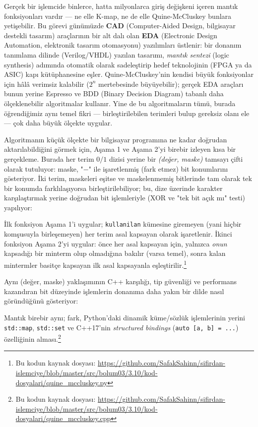 \begin{detaybilgi}
Gerçek bir işlemcide binlerce, hatta milyonlarca giriş değişkeni içeren mantık
fonksiyonları vardır --- ne elle K-map, ne de elle Quine-McCluskey bunlara
yetişebilir. Bu görevi günümüzde \textbf{CAD} (Computer-Aided Design, bilgisayar
destekli tasarım) araçlarının bir alt dalı olan \textbf{EDA} (Electronic Design
Automation, elektronik tasarım otomasyonu) yazılımları üstlenir: bir donanım tanımlama
dilinde (Verilog/VHDL) yazılan tasarımı, \emph{mantık sentezi} (logic synthesis) adımında
otomatik olarak sadeleştirip hedef teknolojinin (FPGA ya da ASIC) kapı kütüphanesine
eşler. Quine-McCluskey'nin kendisi büyük fonksiyonlar için hâlâ verimsiz kalabilir
($2^n$ mertebesinde büyüyebilir); gerçek EDA araçları bunun yerine Espresso ve
BDD (Binary Decision Diagram) tabanlı daha ölçeklenebilir algoritmalar kullanır. Yine
de bu algoritmaların tümü, burada öğrendiğimiz aynı temel fikri --- birleştirilebilen
terimleri bulup gereksiz olanı ele --- çok daha büyük ölçekte uygular.

Algoritmanın küçük ölçekte bir bilgisayar programına ne kadar doğrudan aktarılabildiğini
görmek için, Aşama 1 ve Aşama 2'yi birebir izleyen kısa bir gerçekleme. Burada her terim
$0/1$ dizisi yerine bir \emph{(değer, maske)} tamsayı çifti olarak tutuluyor: maske,
"$-$" ile işaretlenmiş (fark etmez) bit konumlarını gösteriyor. İki terim, maskeleri
eşitse ve maskelenmemiş bitlerinde tam olarak tek bir konumda farklılaşıyorsa
birleştirilebiliyor; bu, dize üzerinde karakter karşılaştırmak yerine doğrudan bit
işlemleriyle (XOR ve "tek bit açık mı" testi) yapılıyor:


İlk fonksiyon Aşama 1'i uygular; \texttt{kullanilan} kümesine giremeyen (yani hiçbir
komşusuyla birleşemeyen) her terim asal kapsayan olarak işaretlenir. İkinci fonksiyon
Aşama 2'yi uygular: önce her asal kapsayan için, yalnızca \emph{onun} kapsadığı bir
minterm olup olmadığına bakılır (varsa temel), sonra kalan mintermler basitçe kapsayan
ilk asal kapsayanla eşleştirilir.\footnote{Bu kodun kaynak dosyası:
\url{https://github.com/SafakSahinn/sifirdan-islemciye/blob/master/src/bolum03/3.10/kod-dosyalari/quine_mccluskey.py}}

Aynı (değer, maske) yaklaşımının C++ karşılığı, tip güvenliği ve performans
kazandıran bit düzeyinde işlemlerin donanıma daha yakın bir dilde nasıl
göründüğünü gösteriyor:


Mantık birebir aynı; fark, Python'daki dinamik küme/sözlük işlemlerinin yerini
\texttt{std::map}, \texttt{std::set} ve C++17'nin \emph{structured bindings}
(\texttt{auto [a, b] = ...}) özelliğinin alması.\footnote{Bu kodun kaynak dosyası:
\url{https://github.com/SafakSahinn/sifirdan-islemciye/blob/master/src/bolum03/3.10/kod-dosyalari/quine_mccluskey.cpp}}
\end{detaybilgi}

